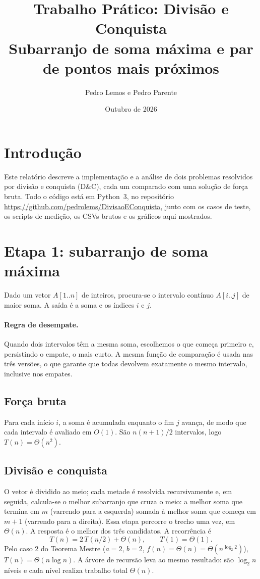 \documentclass[11pt,a4paper]{article}
\title{Trabalho Prático: Divisão e Conquista\\\large Subarranjo de soma máxima e par de pontos mais próximos}
\author{Pedro Lemos \quad e \quad Pedro Parente}
\date{Outubro de 2026}
\begin{document}
\maketitle

\section{Introdução}

Este relatório descreve a implementação e a análise de dois problemas resolvidos
por divisão e conquista (D\&C), cada um comparado com uma solução de força
bruta. Todo o código está em Python~3, no repositório
\url{https://github.com/pedrolems/DivisaoEConquista}, junto com os casos de
teste, os scripts de medição, os CSVs brutos e os gráficos aqui mostrados.

\section{Etapa 1: subarranjo de soma máxima}

Dado um vetor $A[1..n]$ de inteiros, procura-se o intervalo contínuo
$A[i..j]$ de maior soma. A saída é a soma e os índices $i$ e $j$.

\paragraph{Regra de desempate.} Quando dois intervalos têm a mesma soma,
escolhemos o que começa primeiro e, persistindo o empate, o mais curto.
A mesma função de comparação é usada nas três versões, o que garante que todas
devolvem exatamente o mesmo intervalo, inclusive nos empates.

\subsection{Força bruta}
Para cada início $i$, a soma é acumulada enquanto o fim $j$ avança, de modo que
cada intervalo é avaliado em $O(1)$. São $n(n+1)/2$ intervalos, logo
$T(n) = \Theta(n^2)$.

\subsection{Divisão e conquista}
O vetor é dividido ao meio; cada metade é resolvida recursivamente e, em seguida,
calcula-se o melhor subarranjo que cruza o meio: a melhor soma que termina em
$m$ (varrendo para a esquerda) somada à melhor soma que começa em $m+1$
(varrendo para a direita). Essa etapa percorre o trecho uma vez, em $\Theta(n)$.
A resposta é o melhor dos três candidatos. A recorrência é
\[
T(n) = 2\,T(n/2) + \Theta(n), \qquad T(1) = \Theta(1).
\]
Pelo caso 2 do Teorema Mestre ($a=2$, $b=2$, $f(n)=\Theta(n)=\Theta(n^{\log_2 2})$),
$T(n) = \Theta(n \log n)$. A árvore de recursão leva ao mesmo resultado: são
$\log_2 n$ níveis e cada nível realiza trabalho total $\Theta(n)$.
\end{document}
